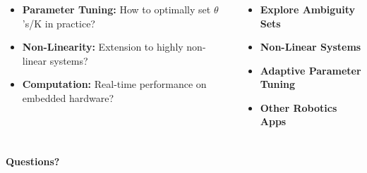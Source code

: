 \documentclass[handout, aspectratio=169]{beamer}
\begin{document}
\begin{frame}
\frametitle{} %
    \begin{columns}[T] %
        \begin{column}{0.55\textwidth} %
            \begin{tcolorbox}[colbacktitle=title1, title=\textbf{Open Questions}] %
                \begin{itemize}
                    \item<1-> \textbf{Parameter Tuning:} How to optimally set $\theta$'s/K in practice? \pause %
                    \item<2-> \textbf{Non-Linearity:} Extension to highly non-linear systems? \pause %
                    \item<3-> \textbf{Computation:} Real-time performance on embedded hardware? %
                \end{itemize}
            \end{tcolorbox}
        \end{column}

        \begin{column}{0.45\textwidth} %
            \begin{tcolorbox}[colbacktitle=title1, title=\textbf{Potential Directions}] %
                \begin{itemize} %
                    \item<4-> \textbf{Explore Ambiguity Sets} \pause %
                    \item<5-> \textbf{Non-Linear Systems} \pause
                    \item<6-> \textbf{Adaptive Parameter Tuning} \pause
                    \item<7-> \textbf{Other Robotics Apps}
                \end{itemize}
            \end{tcolorbox}
            \end{column}       
    \end{columns}
\end{frame}


\begin{frame}[plain]  
   \frametitle{}
    \begin{center}
        \Huge \textbf{Questions?}
    \end{center}
\end{frame}
\end{document}
